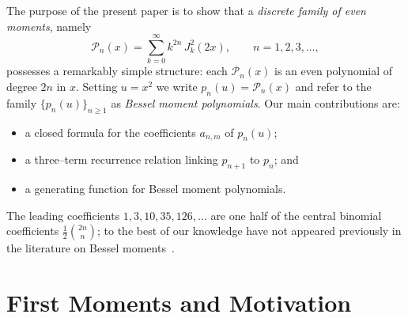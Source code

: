\documentclass[10pt]{NSP1}
\begin{document}
The purpose of the present paper is to show that a \emph{discrete family of even moments}, 
namely
\begin{equation}\label{eq:main}
\mathcal{P}_n(x)=\sum_{k=0}^{\infty}k^{2n}\,J_k^2(2x),\qquad n=1,2,3,\dots,
\end{equation}
possesses a remarkably simple structure: each $\mathcal{P}_n(x)$ is an even polynomial of 
degree $2n$ in $x$.  Setting $u=x^2$ we write $p_n(u)=\mathcal{P}_n(x)$ and refer to the 
family $\{p_n(u)\}_{n\ge 1}$ as \emph{Bessel moment polynomials}.  Our main contributions are:
\begin{itemize}
\item a closed formula for the coefficients $a_{n,m}$ of $p_n(u)$;
\item a three--term recurrence relation linking $p_{n+1}$ to $p_n$; and
\item a generating function for Bessel moment polynomials.

\end{itemize}

The leading coefficients $1,3,10,35,126,\dots$ are one half of the central binomial 
coefficients $\tfrac12\binom{2n}{n}$; to the best of our knowledge have not appeared previously in  the literature on Bessel moments~\cite{Fenyes,Kapteyn,Lommel,OEIS}.


\section{First Moments and Motivation}
\label{sec:first}
\end{document}
